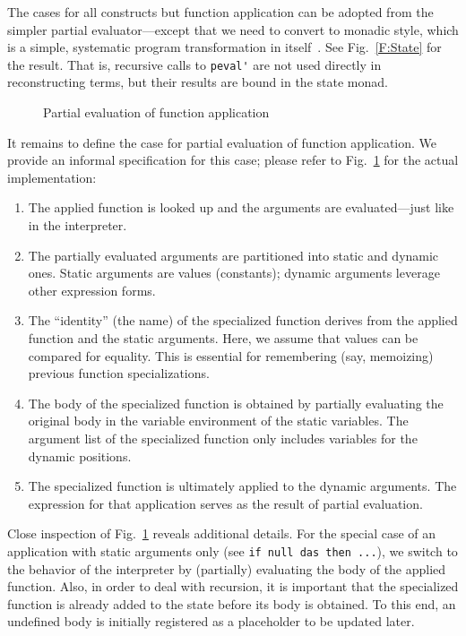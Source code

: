\documentclass{eptcs}
\begin{document}
\noindent
The cases for all constructs but function application can be adopted
from the simpler partial evaluator---except that we need to convert to
monadic style, which is a simple, systematic program transformation in
itself~\cite{Laemmel99,ErwigR04}. See Fig.~\ref{F:State} for the
result. That is, recursive calls to \lstinline{peval'} are not used
directly in reconstructing terms, but their results are bound in the
state monad.

\begin{figure}
 \caption{Partial evaluation of function application}
\label{F:Apply}
\end{figure}

It remains to define the case for partial evaluation of function
application. We provide an informal specification for this case;
please refer to Fig.~\ref{F:Apply} for the actual implementation:

\begin{enumerate}

\item The applied function is looked up and the arguments
are evaluated---just like in the interpreter. 

\item The partially evaluated arguments are partitioned into static
  and dynamic ones.  Static arguments are values (constants); dynamic
  arguments leverage other expression forms.

\item The ``identity'' (the name) of the specialized function derives
  from the applied function and the static arguments. Here, we assume
  that values can be compared for equality. This is essential for
  remembering (say, memoizing) previous function specializations.

\item The body of the specialized function is obtained by partially
  evaluating the original body in the variable environment of the
  static variables. The argument list of the specialized function only
  includes variables for the dynamic positions.

\item The specialized function is ultimately applied to the dynamic
  arguments. The expression for that application serves as the result 
  of partial evaluation.
 
\end{enumerate}

Close inspection of Fig.~\ref{F:Apply} reveals additional details.
For the special case of an application with static arguments only (see
\lstinline{if null das then ...}), we switch to the behavior of the
interpreter by (partially) evaluating the body of the applied
function. Also, in order to deal with recursion, it is important that
the specialized function is already added to the state before its body
is obtained. To this end, an undefined body is initially registered as
a placeholder to be updated later. 
\end{document}
